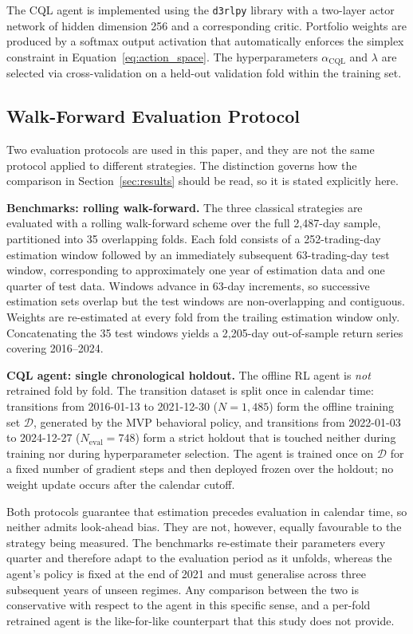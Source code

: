 The CQL agent is implemented using the \texttt{d3rlpy} library
\citep{Seno2022} with a two-layer actor network of hidden dimension 256 and a
corresponding critic.
Portfolio weights are produced by a softmax output activation that
automatically enforces the simplex constraint in Equation~\eqref{eq:action_space}.
The hyperparameters $\alpha_{\text{CQL}}$ and $\lambda$ are selected via
cross-validation on a held-out validation fold within the training set.

\subsection{Walk-Forward Evaluation Protocol}
\label{subsec:walkforward}

Two evaluation protocols are used in this paper, and they are not the same
protocol applied to different strategies.
The distinction governs how the comparison in Section~\ref{sec:results} should
be read, so it is stated explicitly here.

\textbf{Benchmarks: rolling walk-forward.}
The three classical strategies are evaluated with a rolling walk-forward scheme
over the full 2,487-day sample, partitioned into 35 overlapping folds.
Each fold consists of a 252-trading-day estimation window followed by an
immediately subsequent 63-trading-day test window, corresponding to
approximately one year of estimation data and one quarter of test data.
Windows advance in 63-day increments, so successive estimation sets overlap but
the test windows are non-overlapping and contiguous.
Weights are re-estimated at every fold from the trailing estimation window only.
Concatenating the 35 test windows yields a 2,205-day out-of-sample return series
covering 2016--2024.

\textbf{CQL agent: single chronological holdout.}
The offline RL agent is \emph{not} retrained fold by fold.
The transition dataset is split once in calendar time: transitions from
2016-01-13 to 2021-12-30 ($N = 1{,}485$) form the offline training set
$\mathcal{D}$, generated by the MVP behavioral policy, and transitions from
2022-01-03 to 2024-12-27 ($N_{\text{eval}} = 748$) form a strict holdout that is
touched neither during training nor during hyperparameter selection.
The agent is trained once on $\mathcal{D}$ for a fixed number of gradient steps
and then deployed frozen over the holdout; no weight update occurs after the
calendar cutoff.

Both protocols guarantee that estimation precedes evaluation in calendar time,
so neither admits look-ahead bias.
They are not, however, equally favourable to the strategy being measured.
The benchmarks re-estimate their parameters every quarter and therefore adapt to
the evaluation period as it unfolds, whereas the agent's policy is fixed at the
end of 2021 and must generalise across three subsequent years of unseen regimes.
Any comparison between the two is conservative with respect to the agent in this
specific sense, and a per-fold retrained agent is the like-for-like counterpart
that this study does not provide.

